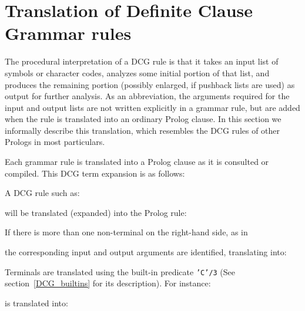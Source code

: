 \section{Translation of Definite Clause Grammar rules}
The procedural interpretation of a DCG rule is that it takes an input
list of symbols or character codes, analyzes some initial portion of that
list, and produces the remaining portion (possibly enlarged, if pushback lists 
are used) as output for further analysis.  As an abbreviation, 
the arguments required for the input and output lists are not written 
explicitly in a grammar rule, but are added when the rule is translated into 
an ordinary Prolog clause.  In this section we informally describe this 
translation, which resembles the DCG rules of other Prologs in most 
particulars.

Each grammar rule is translated into a Prolog clause as it is
consulted or compiled. This DCG term expansion is as follows:

A DCG rule such as:


\noindent
will be translated (expanded) into the Prolog rule:


If there is more than one non-terminal on the right-hand side, as in


\noindent
the corresponding input and output arguments are identified, 
translating into:


Terminals are translated using the built-in predicate {\tt 'C'/3} (See 
section~\ref{DCG_builtins} for its description).  For instance:


\noindent
is translated into:


